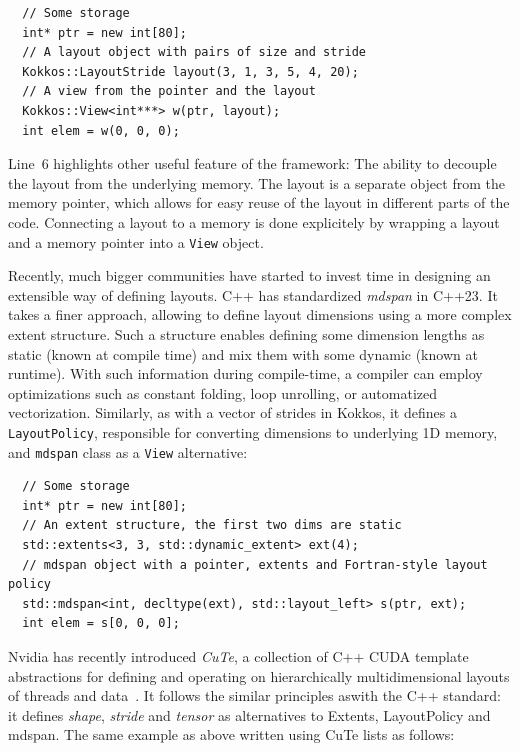 \begin{verbatim}
  // Some storage
  int* ptr = new int[80];
  // A layout object with pairs of size and stride
  Kokkos::LayoutStride layout(3, 1, 3, 5, 4, 20);
  // A view from the pointer and the layout
  Kokkos::View<int***> w(ptr, layout);
  int elem = w(0, 0, 0);
\end{verbatim}

Line~$6$ highlights other useful feature of the framework: The ability to decouple the layout from the underlying memory. The layout is a separate object from the memory pointer, which allows for easy reuse of the layout in different parts of the code. Connecting a layout to a memory is done explicitely by wrapping a layout and a memory pointer into a \texttt{View} object.

Recently, much bigger communities have started to invest time in designing an extensible way of defining layouts. C++ has standardized \emph{mdspan} in C++23. It takes a finer approach, allowing to define layout dimensions using a more complex extent structure. Such a structure enables defining some dimension lengths as static (known at compile time) and mix them with some dynamic (known at runtime). With such information during compile-time, a compiler can employ optimizations such as constant folding, loop unrolling, or automatized vectorization. Similarly, as with a vector of strides in Kokkos, it defines a \texttt{LayoutPolicy}, responsible for converting dimensions to underlying 1D memory, and \texttt{mdspan} class as a \texttt{View} alternative:

\begin{verbatim}
  // Some storage
  int* ptr = new int[80];
  // An extent structure, the first two dims are static 
  std::extents<3, 3, std::dynamic_extent> ext(4);
  // mdspan object with a pointer, extents and Fortran-style layout policy
  std::mdspan<int, decltype(ext), std::layout_left> s(ptr, ext);
  int elem = s[0, 0, 0];
\end{verbatim}

Nvidia has recently introduced \emph{CuTe}, a collection of C++ CUDA template abstractions for defining and operating on hierarchically multidimensional layouts of threads and data~\cite{cute-online}. It follows the similar principles aswith  the C++ standard: it defines \emph{shape}, \emph{stride} and \emph{tensor} as alternatives to Extents, LayoutPolicy and mdspan. The same example as above written using CuTe lists as follows:


